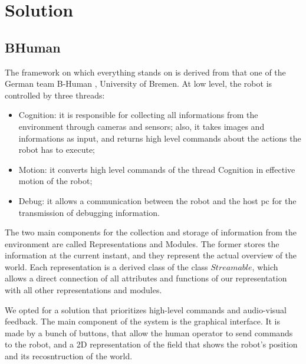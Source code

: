 \documentclass[a4paper, onecolumn, 12pt]{article}
\begin{document}
\section{Solution}
\label{sec:sol}

\subsection{BHuman}
The framework on which everything stands on is derived from that one of the
German team B-Human \cite{}, University of Bremen. At low level, the robot is 
controlled by three threads:
\begin{itemize}
    \item Cognition: it is responsible for collecting all informations from the 
    environment through cameras and sensors; also, it takes images and informations as input,
    and returns high level commands about the actions the robot has to execute;
    \item Motion: it converts high level commands of the thread Cognition in effective
    motion of the robot;
    \item Debug: it allows a communication between the robot and the host pc for the 
    transmission of debugging information.
\end{itemize}

The two main components for the collection and storage of information from the environment
are called Representations and Modules.
The former stores the information at the current instant, and they represent the actual overview
of the world. Each representation is a derived class of the class $Streamable$, which allows a 
direct connection of all attributes and functions of our representation with all other
representations and modules.

We opted for a solution that prioritizes high-level commands and audio-visual
feedback. The main component of the system is the graphical interface. It is
made by a bunch of buttons, that allow the human operator to send commands to the
robot, and a 2D representation of the field that shows the robot's position and
its recosntruction of the world.  
\end{document}

